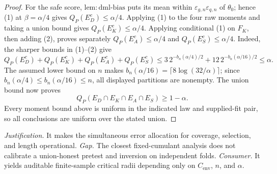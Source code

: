 \documentclass{article}
\begin{document}
\begin{proof}
For the safe score, \(\mathrm{lem:dml\mbox{-}bias}\) puts its mean within \(\varepsilon_{g,n}\varepsilon_{q,n}\) of \(\theta_0\); hence (1) at \(\beta=\alpha/4\) gives \(Q_P(E_D^c)\le\alpha/4\).  Applying (1) to the four raw moments and taking a union bound gives \(Q_P(E_K^c)\le\alpha/4\).  Applying conditional (1) on \(F_K\), then adding (2), proves separately \(Q_P(E_A^c)\le\alpha/4\) and \(Q_P(E_S^c)\le\alpha/4\).  Indeed, the sharper bounds in (1)--(2) give
\[
Q_P(E_D^c)+Q_P(E_K^c)+Q_P(E_A^c)+Q_P(E_S^c)
\le3\,2^{-b_n(\alpha/4)/2}+12\,2^{-b_n(\alpha/16)/2}
\le\alpha.
\]
The assumed lower bound on \(n\) makes \(b_n(\alpha/16)=\lceil8\log(32/\alpha)\rceil\); since \(b_n(\alpha/4)\le b_n(\alpha/16)\le n\), all displayed partitions are nonempty.  The union bound now proves
\[
Q_P(E_D\cap E_K\cap E_A\cap E_S)\ge1-\alpha.
\]
Every moment bound above is uniform in the indicated law and supplied-fit pair, so all conclusions are uniform over the stated union.
\end{proof}
\par\smallskip\noindent \textit{Justification.} It makes the simultaneous error allocation for coverage, selection, and length operational. \textit{Gap.} The closest fixed-cumulant analysis does not calibrate a union-honest pretest and inversion on independent folds. \textit{Consumer.} It yields auditable finite-sample critical radii depending only on \(C_{\mathrm{env}}\), \(n\), and \(\alpha\).
\end{document}
